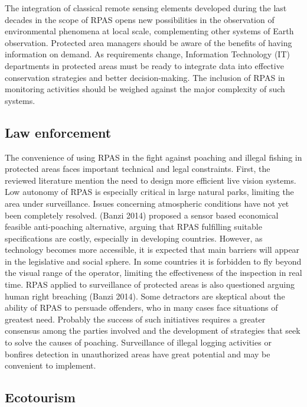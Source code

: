 \documentclass[]{interact}
\theoremstyle{plain}%
\theoremstyle{definition}
\theoremstyle{remark}
\begin{document}
The integration of classical remote sensing elements developed during
the last decades in the scope of RPAS opens new possibilities in the
observation of environmental phenomena at local scale, complementing
other systems of Earth observation. Protected area managers should be
aware of the benefits of having information on demand. As requirements
change, Information Technology (IT) departments in protected areas must
be ready to integrate data into effective conservation strategies and
better decision-making. The inclusion of RPAS in monitoring activities
should be weighed against the major complexity of such systems.

\subsection{Law enforcement}\label{law-enforcement-1}

The convenience of using RPAS in the fight against poaching and illegal
fishing in protected areas faces important technical and legal
constraints. First, the reviewed literature mention the need to design
more efficient live vision systems. Low autonomy of RPAS is especially
critical in large natural parks, limiting the area under surveillance.
Issues concerning atmospheric conditions have not yet been completely
resolved. (Banzi 2014) proposed a sensor based economical feasible
anti-poaching alternative, arguing that RPAS fulfilling suitable
specifications are costly, especially in developing countries. However,
as technology becomes more accessible, it is expected that main barriers
will appear in the legislative and social sphere. In some countries it
is forbidden to fly beyond the visual range of the operator, limiting
the effectiveness of the inspection in real time. RPAS applied to
surveillance of protected areas is also questioned arguing human right
breaching (Banzi 2014). Some detractors are skeptical about the ability
of RPAS to persuade offenders, who in many cases face situations of
greatest need. Probably the success of such initiatives requires a
greater consensus among the parties involved and the development of
strategies that seek to solve the causes of poaching. Surveillance of
illegal logging activities or bonfires detection in unauthorized areas
have great potential and may be convenient to implement.

\subsection{Ecotourism}\label{ecotourism-1}
\end{document}
